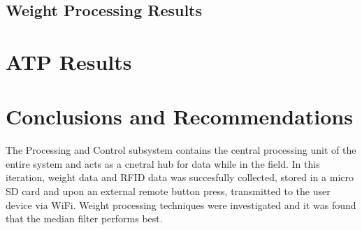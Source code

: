 \documentclass[class=report,11pt,crop=false]{standalone}
\begin{document}
\subsection*{Weight Processing Results}

\section{ATP Results}

\section{Conclusions and Recommendations}

The Processing and Control subsystem contains the central processing unit of the entire system and acts as a cnetral hub for data while in the field. In this iteration, weight data and RFID data was succesfully collected, stored in a micro SD card and upon an external remote button press, transmitted to the user device via WiFi. Weight processing techniques were investigated and it was found that the median filter performs best. 
\ifstandalone
    
\fi
\end{document}
